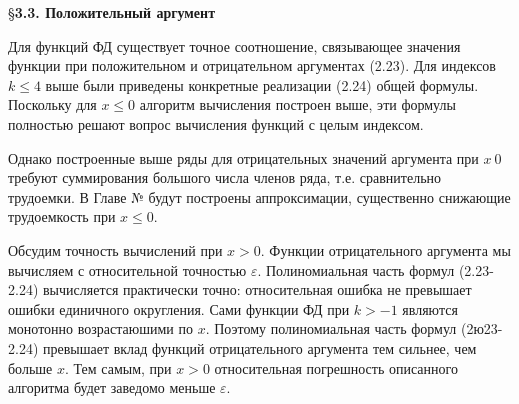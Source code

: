 \S \textbf{3.3. Положительный аргумент}

Для функций ФД существует точное соотношение, связывающее значения функции при положительном и
отрицательном аргументах (2.23). Для индексов $k \leqslant 4$ выше были приведены конкретные реализации (2.24) общей формулы. Поскольку для $x \leqslant 0$ алгоритм вычисления построен выше, эти формулы полностью решают вопрос вычисления функций с целым индексом.

Однако построенные выше ряды для отрицательных значений аргумента при $x~0$ требуют суммирования большого числа членов ряда, т.е. сравнительно трудоемки. В Главе № будут построены аппроксимации, существенно снижающие трудоемкость при $x \leqslant 0$.

Обсудим точность вычислений при $x > 0$. Функции отрицательного аргумента мы вычисляем с относительной точностью $\varepsilon$. Полиномиальная часть формул (2.23-2.24) вычисляется практически точно: относительная ошибка не превышает ошибки единичного округления. Сами функции ФД при $k > -1$ являются монотонно возрастаюшими по $x$. Поэтому полиномиальная часть формул (2ю23-2.24) превышает вклад функций отрицательного аргумента тем сильнее, чем больше $x$. Тем самым, при $x>0$ относительная погрешность описанного алгоритма будет заведомо меньше $\varepsilon$.